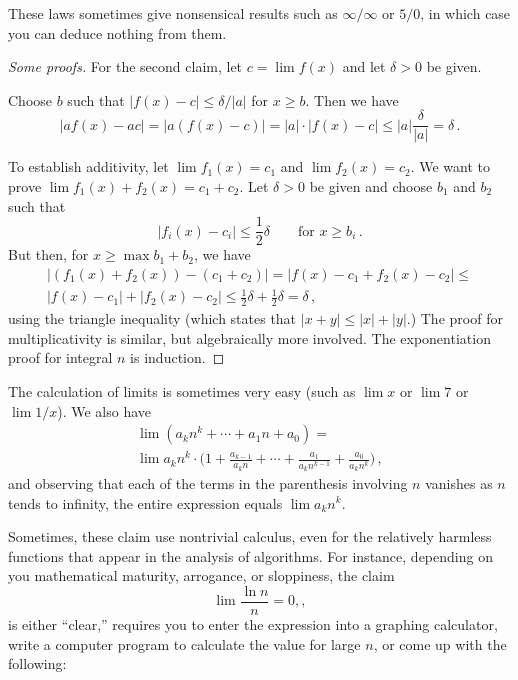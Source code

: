 \documentclass{tstextbook}
\begin{document}
These laws sometimes give nonsensical results such as $\infty/\infty$ or $5/0$, in which case you can deduce nothing from them.


\begin{proof}[Some proofs]
  For the second claim, let $c= \lim f(x)$ and let $\delta >0$ be given.

  Choose $b$ such that $|f(x) - c|\leq \delta/|a|$ for $x\geq b$.
  Then we have 
  \[ |af(x) - ac|= |a(f(x) - c)| = |a|\cdot |f(x)-c| \leq |a|\frac{\delta}{|a|} = \delta\,.\]

  \medskip 
  To establish additivity, let $\lim f_1(x) = c_1$ and $\lim f_2(x) = c_2$.
  We want to prove $\lim f_1(x) + f_2(x) = c_1 + c_2$.
  Let $\delta > 0$ be given and choose $b_1$ and $b_2$ such that 
  \[ |f_i(x) - c_i| \leq \textstyle\frac12\delta \qquad\text{for $x\geq b_i$}\,.\]
  But then, for $x \geq \max{b_1 + b_2}$, we have
  \begin{multline*}
    |(f_1(x)+f_2(x)) - (c_1 + c_2)| = |f(x)-c_1 + f_2(x) -c_2|\leq \\
  |f(x)-c_1| + |f_2(x)-c_2| \leq \textstyle\frac12\delta + \frac12\delta = \delta\,,
  \end{multline*}
  using the triangle inequality (which states that $|x + y|\leq |x| + |y|$.)
  The proof for multiplicativity is similar, but algebraically more involved.
  The exponentiation proof for integral $n$ is induction.
\end{proof}

The calculation of limits is sometimes very easy (such as $\lim x$ or $\lim 7$ or $\lim 1/x$).
We also have
\begin{multline*}
  \lim (a_kn^k+\cdots +a_1n+ a_0 )= \\
  \lim a_kn^k\cdot \bigl(
  1 + \frac{a_{k-1}}{a_k n}  +\cdots +\frac{a_1}{a_k n^{k-1}}+ \frac{a_0}{a_k n^k} \bigr)\,,
\end{multline*}
 and observing that each of the terms in the parenthesis involving $n$ vanishes as $n$ tends to infinity, the entire expression equals $\lim a_kn^k$.

Sometimes, these claim use nontrivial calculus, even for the relatively harmless functions that appear in the analysis of algorithms.
For instance, depending on you mathematical maturity, arrogance, or sloppiness, the claim \[ \lim \frac{\ln n}{n} = 0,,\]
is either ``clear,'' requires you to enter the expression into a graphing calculator, write a computer program to calculate the value for large $n$, or come up with the following:
\end{document}
